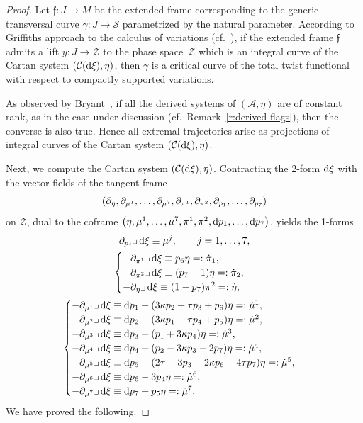 \documentclass[pdftex]{sigma}
\numberwithin{equation}{section}
\def\S{\mathcal{S}}
\def\S{\mathcal{S}}
\begin{document}
\begin{proof}
Let $\mathfrak{f}\colon J \to M$ be the extended frame corresponding to the generic transversal curve
$\gamma\colon J \to \S$ parametrized by the natural parameter.
According to Griffiths approach to the calculus of variations (cf.~\cite{Bryant1987, Gr, Hsu, GM}),
if the extended frame $\mathfrak{f}$
admits a lift $y\colon J \to \mathcal{Z}$ to the phase space~$\mathcal{Z}$ which is an integral curve of the Cartan system $(\mathcal{C}({\rm d}\xi), \eta)$,
then $\gamma$ is a critical curve of the total twist functional with respect to compactly supported variations.

As observed by
Bryant~\cite{Bryant1987}, if all the derived systems
of $(\mathcal{A},\eta)$ are of
constant rank, as in the case under discussion (cf.\ Remark~\ref{r:derived-flags}), then the converse is also true.
Hence all extremal trajectories arise as projections of integral curves of the Cartan
system $(\mathcal{C}({\rm d}\xi), \eta)$.

Next, we compute the Cartan system $(\mathcal{C}({\rm d}\xi), \eta)$.
Contracting the 2-form ${\rm d}\xi$ with the vector fields of the tangent frame
\[
 (\partial_\eta,\partial_{ \mu^1},\dots,\partial_{\mu^7 },
 \partial_{ \pi^1},\partial_{ \pi^2},\partial_{ p_1},\mathellipsis,\partial_{ p_7})
\]
on $\mathcal{Z}$, dual to the coframe $\big(\eta, \mu^1,\dots,\mu^7,\pi^1,\pi^2,{\rm d}p_1,\dots,{\rm d}p_7\big)$,
yields the 1-forms
\begin{gather}%
\partial_{ p_j}{\lrcorner} \,{\rm d}\xi\equiv\mu^j, \qquad j=1,\dots,7, \nonumber
\\
\label{C-system2}\begin{cases}
-\partial_{ \pi^1}\lrcorner \,{\rm d}\xi\equiv p_6\eta = :\dot\pi_1,\\
-\partial_{ \pi^2}\lrcorner\,{\rm d}\xi\equiv (p_7 -1)\eta =:\dot\pi_2,\\
-\partial_\eta\lrcorner\,{\rm d}\xi\equiv (1 - p_7)\pi^2 =:\dot\eta,
\end{cases}
\\ \nonumber %
\begin{cases}
-\partial_{ \mu^1}\lrcorner\,{\rm d}\xi\equiv {\rm d}p_1 + (3\kappa p_2+\tau p_3+p_6)\eta =: \dot\mu^1,\\
-\partial_{ \mu^2}\lrcorner\,{\rm d}\xi\equiv {\rm d}p_2 - (3\kappa p_1-\tau p_4+p_5)\eta =: \dot\mu^2,\\
-\partial_{ \mu^3}\lrcorner\,{\rm d}\xi\equiv {\rm d}p_3 + (p_1+3\kappa p_4)\eta =: \dot\mu^3,\\
-\partial_{ \mu^4}\lrcorner\,{\rm d}\xi\equiv {\rm d}p_4 + (p_2-3\kappa p_3-2p_7)\eta =:\dot\mu^4,\\
-\partial_{ \mu^5}\lrcorner\,{\rm d}\xi\equiv {\rm d}p_5 - (2\tau - 3p_3- 2\kappa p_6 - 4\tau p_7)\eta=: \dot\mu^5,\\
-\partial_{ \mu^6}\lrcorner\,{\rm d}\xi\equiv {\rm d}p_6-3p_4\eta = : \dot\mu^6,\\
-\partial_{ \mu^7}\lrcorner\,{\rm d}\xi\equiv {\rm d}p_7 + p_5\eta =: \dot\mu^7.
\end{cases}
\end{gather}
We have proved the following.


\end{proof}
\end{document}
